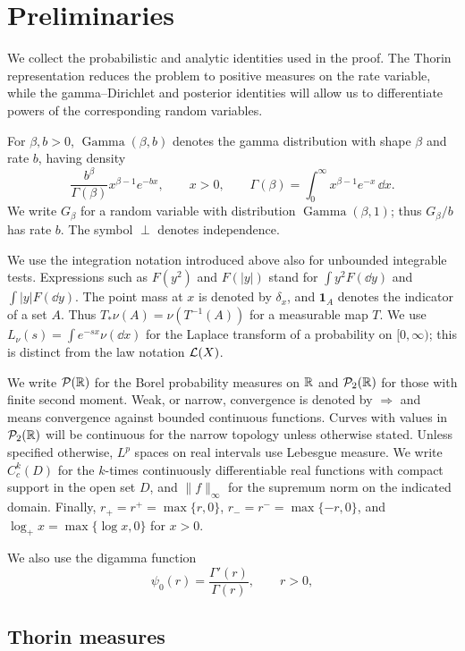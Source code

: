 \section{Preliminaries}
\label{sec:foundations}

We collect the probabilistic and analytic identities used in the proof.
The Thorin representation reduces the problem to positive measures on the rate variable, while the gamma--Dirichlet and posterior identities will allow us to differentiate powers of the corresponding random variables.

For $\beta,b>0$, $\operatorname{Gamma}(\beta,b)$ denotes the gamma distribution with shape $\beta$ and rate $b$, having density
\[
 \frac{b^\beta}{\Gamma(\beta)}x^{\beta-1}e^{-bx},\qquad x>0,
 \qquad
 \Gamma(\beta)=\int_0^\infty x^{\beta-1}e^{-x}\,\dd x.
\]
We write $G_\beta$ for a random variable with distribution $\operatorname{Gamma}(\beta,1)$; thus $G_\beta/b$ has rate $b$.
The symbol $\perp$ denotes independence.

We use the integration notation introduced above also for unbounded integrable tests.
Expressions such as $F(y^2)$ and $F(|y|)$ stand for $\int y^2F(\dd y)$ and $\int |y|F(\dd y)$.
The point mass at $x$ is denoted by $\delta_x$, and $\mathbf1_A$ denotes the indicator of a set $A$.
Thus $T_*\nu(A)=\nu(T^{-1}(A))$ for a measurable map $T$.
We use $L_\nu(s)=\int e^{-sx}\nu(\dd x)$ for the Laplace transform of a probability on $[0,\infty)$; this is distinct from the law notation $\mathcal L(X)$.

We write $\mathcal P(\mathbb R)$ for the Borel probability measures on $\mathbb R$ and $\mathcal P_2(\mathbb R)$ for those with finite second moment.
Weak, or narrow, convergence is denoted by $\Rightarrow$ and means convergence against bounded continuous functions.
Curves with values in $\mathcal P_2(\mathbb R)$ will be continuous for the narrow topology unless otherwise stated.
Unless specified otherwise, $L^p$ spaces on real intervals use Lebesgue measure.
We write $C_c^k(D)$ for the $k$-times continuously differentiable real functions with compact support in the open set $D$, and $\|f\|_\infty$ for the supremum norm on the indicated domain.
Finally, $r_+=r^+=\max\{r,0\}$, $r_-=r^-=\max\{-r,0\}$, and $\log_+x=\max\{\log x,0\}$ for $x>0$.

We also use the digamma function
\[
  \psi_0(r)=\frac{\Gamma'(r)}{\Gamma(r)},\qquad r>0,
\]

\subsection{Thorin measures}

